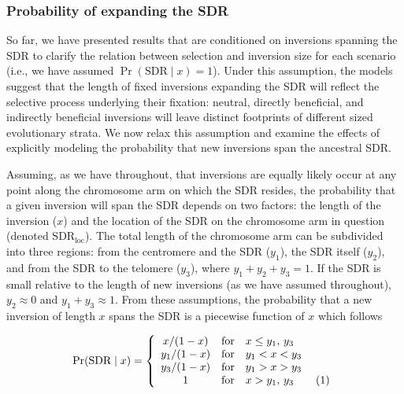 \documentclass{article}
\newcommand\numberthis{\addtocounter{equation}{1}\tag{\theequation}}
\begin{document}



\subsubsection*{Probability of expanding the SDR}\label{sec:ProbExpSDR}

So far, we have presented results that are conditioned on inversions spanning the SDR to clarify the relation between selection and inversion size for each scenario (i.e., we have assumed $\Pr(\text{SDR} \mid x) = 1$). Under this assumption, the models suggest that the length of fixed inversions expanding the SDR will reflect the selective process underlying their fixation: neutral, directly beneficial, and indirectly beneficial inversions will leave distinct footprints of different sized evolutionary strata. We now relax this assumption and examine the effects of explicitly modeling the probability that new inversions span the ancestral SDR.

Assuming, as we have throughout, that inversions are equally likely occur at any point along the chromosome arm on which the SDR resides, the probability that a given inversion will span the SDR depends on two factors: the length of the inversion ($x$) and the location of the SDR on the chromosome arm in question (denoted $\text{SDR}_{\text{loc}}$). The total length of the chromosome arm can be subdivided into three regions: from the centromere and the SDR ($y_1$), the SDR itself ($y_2$), and from the SDR to the telomere ($y_3$), where $y_1 + y_2 + y_3 = 1$. If the SDR is small relative to the length of new inversions (as we have assumed throughout), $y_2 \approx 0$ and $y_1 + y_3 \approx 1$. From these assumptions, the probability that a new inversion of length $x$ spans the SDR is a piecewise function of $x$ which follows

\begin{equation}\label{eq:PrSpanSDR}
	\Pr(\text{SDR} \mid x) = \left\{ 
		\begin{array}{ccl} 
			x  /(1 - x) & \mbox{for} & x \leq y_1,\,y_3 \\
			y_1/(1 - x) & \mbox{for} & y_1 < x < y_3 \\ 
			y_3/(1 - x) & \mbox{for} & y_1 > x > y_3 \\ 
			1 & \mbox{for} & x > y_1,\,y_3 \numberthis			
		\end{array}\right.
\end{equation}
\end{document}
